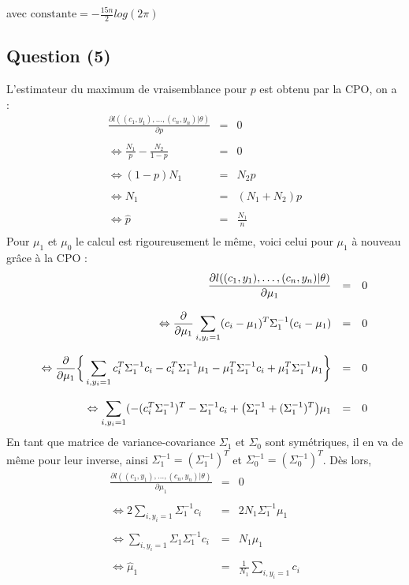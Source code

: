 \documentclass[10pt,a4paper]{report}\usepackage[]{graphicx}\usepackage[]{color}
\begin{document}
avec $\mbox{constante} = -\frac{15n}{2}log(2\pi)$


\subsection{Question (5)}
\noindent L'estimateur du maximum de vraisemblance pour $p$ est obtenu par la CPO, on a :
$$
\begin{array}{rcl}
\displaystyle{\frac{\partial l((c_1,y_1),\hdots,(c_n,y_n)|\theta)}{\partial p}} & = & 0 \\ \\
\displaystyle{\Leftrightarrow \frac{N_1}{p} - \frac{N_2}{1-p}} & = & 0 \\ \\
\Leftrightarrow (1-p)N_1 & = & N_2 p \\ \\
\Leftrightarrow N_1 & = & (N_1 + N_2) p \\ \\
\Leftrightarrow \hat{p} & = & \displaystyle{\frac{N_1}{n}} \\
\end{array}
$$
Pour $\mu_1$ et $\mu_0$ le calcul est rigoureusement le m\^eme, voici celui pour $\mu_1$ \`a nouveau gr\^ace \`a la CPO : 
$$
\begin{array}{rcl}
\displaystyle{\frac{\partial l((c_1,y_1),\hdots,(c_n,y_n)|\theta)}{\partial\mu_1}} & = & 0 \\ \\
\displaystyle{\Leftrightarrow \frac{\partial}{\partial \mu_1} \sum_{i,y_i = 1}(c_i-\mu_1)^T\Sigma_1^{-1} (c_i-\mu_1)} & = & 0  \\ \\
\displaystyle{\Leftrightarrow \frac{\partial}{\partial \mu_1}\bigg{\{}}\sum_{i,y_i = 1}c_i^T\Sigma_1^{-1}c_i - c_i^T\Sigma_1^{-1}\mu_1 - \mu_1^T\Sigma_1^{-1}c_i + \mu_1^T\Sigma_1^{-1}\mu_1\bigg{\}} & = & 0 \\ \\
\displaystyle{\Leftrightarrow \sum_{i,y_i = 1}(- (c_i^T\Sigma_1^{-1})^T - \Sigma_1^{-1} c_i + \big{(} \Sigma_1^{-1} + (\Sigma_1^{-1})^T \big{)}\mu_1 } & = & 0
\end{array}
$$
En tant que matrice de variance-covariance $\Sigma_1$ et $\Sigma_0$ sont sym\'etriques, il en va de m\^eme pour leur inverse, ainsi $\Sigma_1^{-1} = (\Sigma_1^{-1})^T$ et $\Sigma_0^{-1} = (\Sigma_0^{-1})^T$. D\`es lors,
$$
\begin{array}{rcl}
\displaystyle{\frac{\partial l((c_1,y_1),\hdots,(c_n,y_n)|\theta)}{\partial\mu_1}} & = & 0 \\ \\
\displaystyle{\Leftrightarrow 2\sum_{i,y_i = 1}\Sigma_1^{-1} c_i} & = & \displaystyle{2 N_1\Sigma_1^{-1}\mu_1} \\ \\
\displaystyle{\Leftrightarrow \sum_{i,y_i = 1}\Sigma_1 \Sigma_1^{-1} c_i} & = & N_1 \mu_1 \\ \\
\displaystyle{\Leftrightarrow \hat \mu_1} & = & \displaystyle{\frac{1}{N_1}\sum_{i,y_i = 1} c_i}
\end{array}
$$
\end{document}
